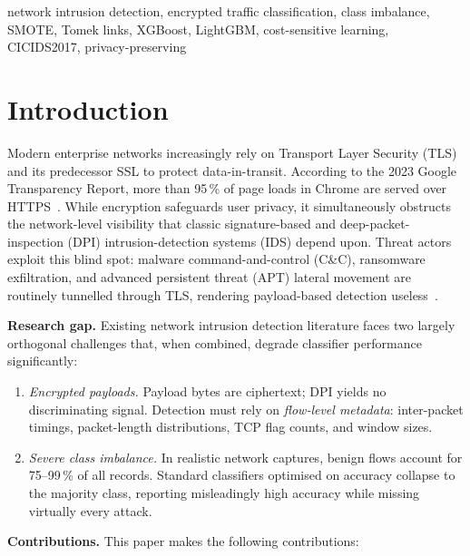 \documentclass[conference]{IEEEtran}
\begin{document}
\begin{IEEEkeywords}
network intrusion detection, encrypted traffic classification,
class imbalance, SMOTE, Tomek links, XGBoost, LightGBM,
cost-sensitive learning, CICIDS2017, privacy-preserving
\end{IEEEkeywords}

\section{Introduction}
\label{sec:intro}

Modern enterprise networks increasingly rely on Transport Layer
Security (TLS) and its predecessor SSL to protect data-in-transit.
According to the 2023 Google Transparency Report, more than
95\,\% of page loads in Chrome are served over HTTPS~\cite{google2023}.
While encryption safeguards user privacy, it simultaneously obstructs
the network-level visibility that classic signature-based and
deep-packet-inspection (DPI) intrusion-detection systems (IDS) depend
upon.  Threat actors exploit this blind spot: malware command-and-control
(C\&C), ransomware exfiltration, and advanced persistent threat (APT)
lateral movement are routinely tunnelled through TLS, rendering
payload-based detection useless~\cite{rezaei2019}.

\textbf{Research gap.}  Existing network intrusion detection literature
faces two largely orthogonal challenges that, when combined, degrade
classifier performance significantly:

\begin{enumerate}
\item \textit{Encrypted payloads.}  Payload bytes are ciphertext; DPI
      yields no discriminating signal.  Detection must rely on
      \textit{flow-level metadata}: inter-packet timings, packet-length
      distributions, TCP flag counts, and window sizes.
\item \textit{Severe class imbalance.}  In realistic network captures,
      benign flows account for 75--99\,\% of all records.  Standard
      classifiers optimised on accuracy collapse to the majority class,
      reporting misleadingly high accuracy while missing virtually every
      attack.
\end{enumerate}

\textbf{Contributions.}  This paper makes the following contributions:
\end{document}
